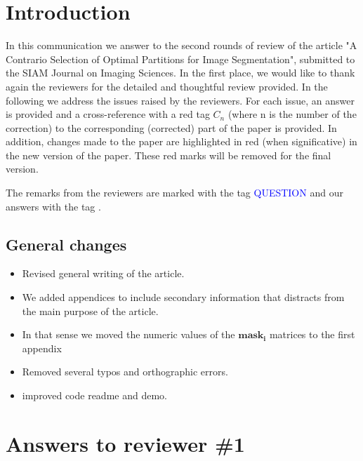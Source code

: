 \documentclass[a4paper,10pt]{report}
\title{}
\author{}
\begin{document}
\maketitle


\chapter{Introduction}
In this communication we answer to the second rounds of review of the article "A Contrario Selection of Optimal Partitions for Image Segmentation", submitted to the SIAM Journal on Imaging Sciences.
In the first place, we would like to thank again the reviewers for the detailed and thoughtful review provided. In the following we address the issues raised by the reviewers. For each issue, an answer is provided and a cross-reference with a red tag $C_n$ (where n is the number of the correction) to the corresponding (corrected) part of the paper is provided. In addition, changes made to the paper are highlighted in red (when significative) in the new version of the paper. 
These red marks will be removed for the final version.

The remarks from the reviewers are marked with the tag \textcolor{blue}{QUESTION} and our answers with the tag \ans.

\section{General changes}
\begin{itemize}
 \item Revised general writing of the article.
\item We added appendices to include secondary information that distracts from the main purpose of the article.
\item In that sense we moved the numeric values of the $\mathbf{mask_i}$ matrices to the first appendix
\item Removed several typos and orthographic errors.
\item improved code readme and demo.
\end{itemize}


\chapter{Answers to reviewer \#1}
\end{document}
